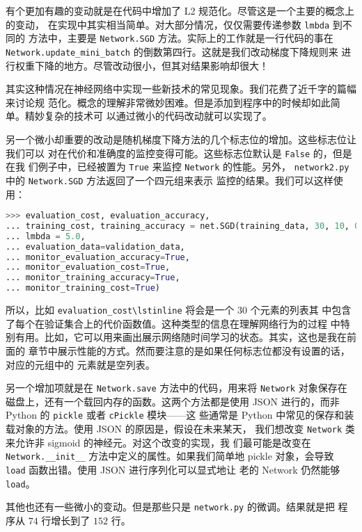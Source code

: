 有个更加有趣的变动就是在代码中增加了 L2 规范化。尽管这是一个主要的概念上的变动，
在实现中其实相当简单。对大部分情况，仅仅需要传递参数 \lstinline!lmbda! 到不同的
方法中，主要是 \lstinline!Network.SGD! 方法。实际上的工作就是一行代码的事在
\lstinline!Network.update_mini_batch! 的倒数第四行。这就是我们改动梯度下降规则来
进行权重下降的地方。尽管改动很小，但其对结果影响却很大！

其实这种情况在神经网络中实现一些新技术的常见现象。我们花费了近千字的篇幅来讨论规
范化。概念的理解非常微妙困难。但是添加到程序中的时候却如此简单。精妙复杂的技术可
以通过微小的代码改动就可以实现了。

另一个微小却重要的改动是随机梯度下降方法的几个标志位的增加。这些标志位让我们可以
对在代价和准确度的监控变得可能。这些标志位默认是 \lstinline!False! 的，但是在我
们例子中，已经被置为 \lstinline!True! 来监控 \lstinline!Network! 的性能。另外，
\lstinline!network2.py! 中的 \lstinline!Network.SGD! 方法返回了一个四元组来表示
监控的结果。我们可以这样使用：
\begin{lstlisting}[language=Python]
>>> evaluation_cost, evaluation_accuracy, 
... training_cost, training_accuracy = net.SGD(training_data, 30, 10, 0.5,
... lmbda = 5.0,
... evaluation_data=validation_data,
... monitor_evaluation_accuracy=True,
... monitor_evaluation_cost=True,
... monitor_training_accuracy=True,
... monitor_training_cost=True)
\end{lstlisting}

所以，比如 \lstinline!evaluation_cost\lstinline! 将会是一个 $30$ 个元素的列表其
中包含了每个\epoch{}在验证集合上的代价函数值。这种类型的信息在理解网络行为的过程
中特别有用。比如，它可以用来画出展示网络随时间学习的状态。其实，这也是我在前面的
章节中展示性能的方式。然而要注意的是如果任何标志位都没有设置的话，对应的元组中的
元素就是空列表。

另一个增加项就是在 \lstinline!Network.save! 方法中的代码，用来将
\lstinline!Network! 对象保存在磁盘上，还有一个载回内存的函数。这两个方法都是使用
JSON 进行的，而非 Python 的 \lstinline!pickle! 或者 \lstinline!cPickle! 模块——这
些通常是 Python 中常见的保存和装载对象的方法。使用 JSON 的原因是，假设在未来某天，
我们想改变 \lstinline!Network! 类来允许非 sigmoid 的神经元。对这个改变的实现，我
们最可能是改变在 \lstinline!Network.__init__! 方法中定义的属性。如果我们简单地
pickle 对象，会导致 \lstinline!load! 函数出错。使用 JSON 进行序列化可以显式地让
老的 Network 仍然能够 \lstinline!load!。

其他也还有一些微小的变动。但是那些只是 \lstinline!network.py! 的微调。结果就是把
程序从 $74$ 行增长到了 $152$ 行。

